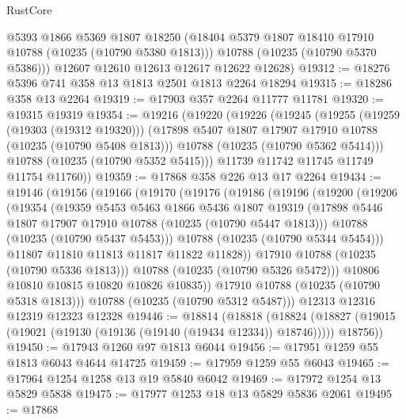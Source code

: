 \begin{lexlean}{RustCore}
\begin{coremodule}
        @5393
        @1866
        @5369
        @1807
        @18250
        (@18404 @5379 @1807 @18410 @17910 @10788 (@10235 (@10790 @5380 @1813)))
        @10788
        (@10235 (@10790 @5370 @5386)))
      @12607
      @12610
      @12613
      @12617
      @12622
      @12628)
@19312 := @18276 @5396 @741 @358 @13 @1813 @2501 @1813 @2264 @18294
@19315 := @18286 @358 @13 @2264
@19319 := @17903 @357 @2264 @11777 @11781
@19320 := @19315 @19319
@19354 := @19216
    (@19220
      (@19226
        (@19245
          (@19255
            (@19259 (@19303 (@19312 @19320)))
            (@17898 @5407 @1807 @17907 @17910 @10788 (@10235 (@10790 @5408 @1813)))
            @10788
            (@10235 (@10790 @5362 @5414)))
          @10788
          (@10235 (@10790 @5352 @5415)))
        @11739
        @11742
        @11745
        @11749
        @11754
        @11760))
@19359 := @17868 @358 @226 @13 @17 @2264
@19434 := @19146
    (@19156
      (@19166
        (@19170
          (@19176
            (@19186
              (@19196
                (@19200
                  (@19206
                    (@19354
                      (@19359
                        @5453
                        @5463
                        @1866
                        @5436
                        @1807
                        @19319
                        (@17898 @5446 @1807 @17907 @17910 @10788 (@10235 (@10790 @5447 @1813)))
                        @10788
                        (@10235 (@10790 @5437 @5453)))
                      @10788
                      (@10235 (@10790 @5344 @5454)))
                    @11807
                    @11810
                    @11813
                    @11817
                    @11822
                    @11828))
                @17910
                @10788
                (@10235 (@10790 @5336 @1813)))
              @10788
              (@10235 (@10790 @5326 @5472)))
            @10806
            @10810
            @10815
            @10820
            @10826
            @10835))
        @17910
        @10788
        (@10235 (@10790 @5318 @1813)))
      @10788
      (@10235 (@10790 @5312 @5487)))
    @12313
    @12316
    @12319
    @12323
    @12328
@19446 := @18814
    (@18818
      (@18824 (@18827 (@19015 (@19021 (@19130 (@19136 (@19140 (@19434 @12334)) @18746))))) @18756))
@19450 := @17943 @1260 @97 @1813 @6044
@19456 := @17951 @1259 @55 @1813 @6043 @4644 @14725
@19459 := @17959 @1259 @55 @6043
@19465 := @17964 @1254 @1258 @13 @19 @5840 @6042
@19469 := @17972 @1254 @13 @5829 @5838
@19475 := @17977 @1253 @18 @13 @5829 @5836 @2061
@19495 := @17868

\end{coremodule}
\end{lexlean}

